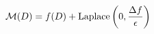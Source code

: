\documentclass[preview]{standalone}
\begin{document}
\begin{align*}
\special{dvisvgm:raw <g id='unique000'>}\mathcal{M}(D) = f(D) + \text{Laplace}\left(0, \frac{\Delta f}{\epsilon}\right)\special{dvisvgm:raw </g>}
\end{align*}
\end{document}
